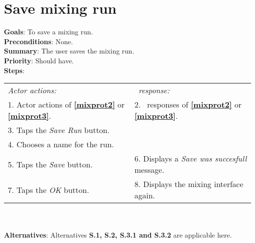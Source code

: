      \section{Save mixing run}
  \label{saverun}
  \textbf{Goals}: To save a mixing run.\\
  \textbf{Preconditions}: None. \\
  \textbf{Summary}: The user saves the mixing run.\\
  \textbf{Priority}: Should have.\\
  \textbf{Steps}: \\
  \begin{tabular}{ p{} p{} }
  	\emph{Actor actions:} & \emph{\projectname\ response:} \\
  	1. Actor actions of \textbf{\ref{mixprot2}} or \textbf{\ref{mixprot3}}. & 2. \projectname\ responses of \textbf{\ref{mixprot2}} or \textbf{\ref{mixprot3}}. \\
    3. Taps the \emph{Save Run} button.  & \\
    4. Chooses a name for the run. & \\
    5. Taps the \emph{Save} button. & 6. Displays a \emph{Save was succesfull} message.\\
    7. Taps the \emph{OK} button. & 8. Displays the mixing interface again. \\
      \end{tabular}
    	 \\
    \\\textbf{Alternatives}: Alternatives \textbf{S.1, S.2, S.3.1 and S.3.2} are applicable here.
    


  
  
